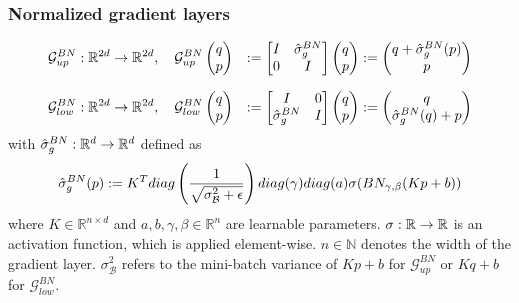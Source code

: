 \documentclass[twoside,a4paper]{article}
\begin{document}

\subsubsection{Normalized gradient layers}

\begin{alignat*}{2}
	\mathcal{G}^{BN}_{up} &: \mathbb{R}^{2d} \to \mathbb{R}^{2d}, \quad
	\mathcal{G}^{BN}_{up} \begin{pmatrix} q \\ p \end{pmatrix} &:= \begin{bmatrix} I & {\hat{\sigma}^{BN}_g} \\ 0 & I \end{bmatrix} \begin{pmatrix} q \\ p \end{pmatrix} := \begin{pmatrix}
		q + \hat{\sigma}^{BN}_g(p) \\
		p
	\end{pmatrix} \\[7pt]
	\mathcal{G}^{BN}_{low} &: \mathbb{R}^{2d} \to \mathbb{R}^{2d}, \quad
	\mathcal{G}^{BN}_{low} \begin{pmatrix} q \\ p \end{pmatrix} &:= \begin{bmatrix} I & 0 \\ {\hat{\sigma}^{BN}_g} & I \end{bmatrix} \begin{pmatrix} q \\ p \end{pmatrix} := \begin{pmatrix}
		q \\
		\hat{\sigma}^{BN}_g(q) + p
	\end{pmatrix}
\end{alignat*}
with $\hat{\sigma}^{BN}_g : \mathbb{R}^d \to \mathbb{R}^d$ defined as
\begin{equation*}
	\hat{\sigma}^{BN}_g(p) := 
	K^T diag\left( \frac{1}{\sqrt{\sigma^2_\mathcal{B} + \epsilon}} \right) diag(\gamma)
	diag(a) \sigma(BN_{\gamma, \beta}(Kp+b))
\end{equation*}
where $K \in \mathbb{R}^{n \times d}$ and $a,b, \gamma, \beta \in \mathbb{R}^n$
are learnable parameters. $\sigma : \mathbb{R} \to \mathbb{R}$ 
is an activation function, which is applied element-wise.
$n \in \mathbb{N}$ denotes the width of the gradient layer.
$\sigma^2_\mathcal{B}$ refers to the mini-batch variance of $Kp+b$ for $\mathcal{G}^{BN}_{up}$
or $Kq+b$ for $\mathcal{G}^{BN}_{low}$.


\end{document}
